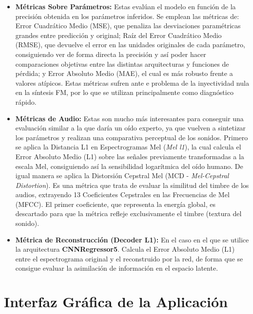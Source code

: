 \begin{itemize}

\item \textbf{Métricas Sobre Parámetros: } Estas evalúan el modelo en función de la precisión obtenida
en los parámetros inferidos. Se emplean las métricas de: Error Cuadrático Medio (MSE), que penaliza las desviaciones paramétricas grandes 
entre predicción y original; Raíz del Error Cuadrático Medio (RMSE), que devuelve el error en las unidades originales de cada parámetro, consiguiendo
ver de forma directa la precisión y así poder hacer comparaciones objetivas entre las distintas arquitecturas y funciones de pérdida;
y Error Absoluto Medio (MAE), el cual es más robusto frente a valores atípicos. Estas métricas sufren ante e problema de la inyectividad 
nula en la síntesis FM, por lo que se utilizan principalmente como diagnóstico rápido.

\item \textbf{Métricas de Audio: } Estas son mucho más interesantes para conseguir una evaluación
similar a la que daría un oído experto, ya que vuelven a sintetizar los parámetros y realizan una comparativa
perceptual de los sonidos. Primero se aplica la Distancia L1 en Espectrogramas Mel (\textit{Mel l1}), la cual calcula el 
Error Absoluto Medio (L1) sobre las señales previamente transformadas a la escala Mel, consiguiendo así la sensibilidad logarítmica
del oído humano. De igual manera se aplica la Distorsión Cepstral Mel (MCD - \textit{Mel-Cepstral Distortion}). Es una métrica que trata 
de evaluar la similitud del timbre de los audios, extrayendo 13 Coeficientes Cepstrales en las Frecuencias de Mel (MFCC). 
El primer coeficiente, que representa la energía global, es descartado para que la métrica refleje exclusivamente el timbre (textura del sonido).

\item \textbf{Métrica de Reconstrucción (Decoder L1): } En el caso en el que se utilice la arquitectura
\textbf{CNNRegressor5}. Calcula el Error Absoluto Medio (L1) entre el espectrograma original y el reconstruido por la red,
de forma que se consigue evaluar la asimilación de información en el espacio latente. 

\end{itemize}

\section{Interfaz Gráfica de la Aplicación}

